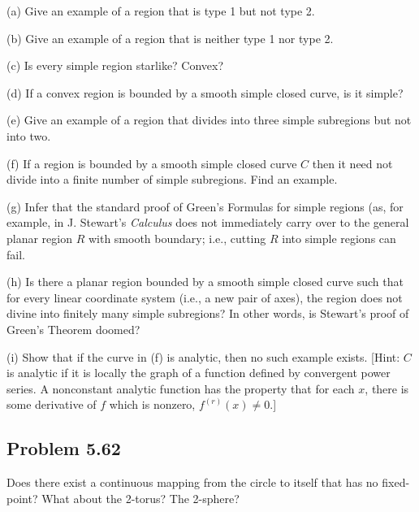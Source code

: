 \documentclass{amsart}
\begin{document}
(a) Give an example of a region that is type 1 but not type 2.

(b) Give an example of a region that is neither type 1 nor type 2.

(c) Is every simple region starlike? Convex?

(d) If a convex region is bounded by a smooth simple closed curve, is it simple?

(e) Give an example of a region that divides into three simple subregions but not into two.

(f) If a region is bounded by a smooth simple closed curve $C$ then it need not divide into a finite number of simple subregions. Find an example.

(g) Infer that the standard proof of Green's Formulas for simple regions (as, for example, in J. Stewart's \textit{Calculus} does not immediately carry over to the general planar region $R$ with smooth boundary; i.e., cutting $R$ into simple regions can fail.

(h) Is there a planar region bounded by a smooth simple closed curve such that for every linear coordinate system (i.e., a new pair of axes), the region does not divine into finitely many simple subregions? In other words, is Stewart's proof of Green's Theorem doomed?

(i) Show that if the curve in (f) is analytic, then no such example exists. [Hint: $C$ is analytic if it is locally the graph of a function defined by convergent power series. A nonconstant analytic function has the property that for each $x$, there is some derivative of $f$ which is nonzero, $f^{(r)}(x)\neq 0$.]

\medskip \noindent

\newpage

\subsection*{Problem 5.62} Does there exist a continuous mapping from the circle to itself that has no fixed-point? What about the 2-torus? The 2-sphere?

\medskip \noindent

\newpage
\end{document}
